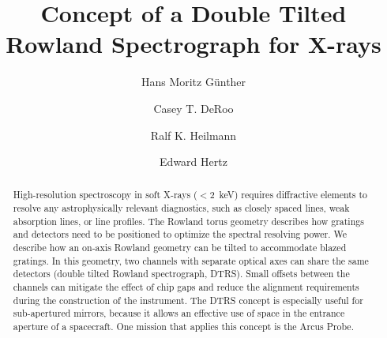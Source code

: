 \documentclass[twocolumn]{aastex631}
\begin{document}
\title{Concept of a Double Tilted Rowland Spectrograph for X-rays}





\author[0000-0003-4243-2840]{Hans Moritz G{\"u}nther}
\author[0000-0002-9184-4561]{Casey T. DeRoo}
\author[0000-0001-9980-5295]{Ralf K. Heilmann}
\author[0000-0002-6747-9648]{Edward Hertz}


\begin{abstract}
High-resolution spectroscopy in soft X-rays ($<2$~keV) requires diffractive elements to resolve any astrophysically relevant diagnostics, such as closely spaced lines, weak absorption lines, or line profiles. The Rowland torus geometry describes how gratings and detectors need to be positioned to optimize the spectral resolving power. We describe how an on-axis Rowland geometry can be tilted to accommodate blazed gratings. In this geometry, two channels with separate optical axes can share the same detectors (double tilted Rowland spectrograph, DTRS). Small offsets between the channels can mitigate the effect of chip gaps and reduce the alignment requirements during the construction of the instrument. The DTRS concept is especially useful for sub-apertured mirrors, because it allows an effective use of space in the entrance aperture of a spacecraft.
One mission that applies this concept is the Arcus Probe.

\end{abstract}
\end{document}
